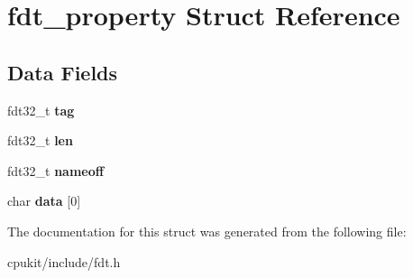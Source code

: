 \hypertarget{structfdt__property}{}\section{fdt\+\_\+property Struct Reference}
\label{structfdt__property}
\subsection*{Data Fields}
\begin{DoxyCompactItemize}
\item 
\mbox{\label{structfdt__property_a6c0d0fd0e741c931f7b3ca1482193740}} 
fdt32\+\_\+t {\bfseries tag}
\item 
\mbox{\label{structfdt__property_a48e6236319453578c3ca7c106b382a2f}} 
fdt32\+\_\+t {\bfseries len}
\item 
\mbox{\label{structfdt__property_ad5753794266beffe67b79b6e5b3ab352}} 
fdt32\+\_\+t {\bfseries nameoff}
\item 
\mbox{\label{structfdt__property_a32114ac9139f0cf9b17e3592088a23fa}} 
char {\bfseries data} \mbox{[}0\mbox{]}
\end{DoxyCompactItemize}


The documentation for this struct was generated from the following file\+:\begin{DoxyCompactItemize}
\item 
cpukit/include/fdt.\+h\end{DoxyCompactItemize}
